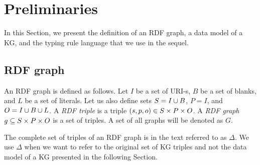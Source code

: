 \documentclass[runningheads]{llncs}
\newcommand{\memo}[1]{}
\begin{document}
\memo{
We propose to infer first the
ground type of $t$ using the stored typing of identifiers. The ground
type is minimized and then generalized to the minimal upper bound
(MUB) type. The MUB type of $t$ is an appropriate starting point to
search for the schema types of $t$ from a KG conceptual schema.

The schema type of $t=(s,p,o)$ is derived as follows. Using the
predicate $p$ as the starting point, we choose from a stored schema of
a KG all valid triple types including a predicate $p$ or one of $p$'s
super-predicates. The set of all valid schema types is minimized to
obtain a set of minimal and unrelated schema types, the candidates for
the type of $t$. 

The appropriate candidate schema types are selected by relating the
candidates to the MUB ground type by means of a subtype relation. The
disjunctively bound candidate schema types, that are related to the
MUB ground type via subtype relation, represent the final type of~$t$.

}





\section{Preliminaries\label{sec:prelim}}

In this Section, we present the definition of an RDF graph, a data model
of a KG, and the typing rule language that we use in the sequel.



\subsection{RDF graph\label{sec:kg}}

An RDF graph \cite{rdf} is defined as follows. Let $I$ be a set of
URI-s, $B$ be a set of blanks, and $L$ be a set of literals. Let us
also define sets $S = I\cup\/B$, $P = I$, and $O = I\cup\/B\cup\/L$. A
\emph{RDF triple} is a triple $(s,p,o)\in\/S\times\/P\times\/O$. A
\emph{RDF graph} $g\subseteq\/S\times\/P\times\/O$ is a set of
triples. A set of all graphs will be denoted as $G$.

The complete set of triples of an RDF graph is in the text
referred to as $\Delta$. We use $\Delta$ when we want to refer
to the original set of KG triples and not the data model of a KG
presented in the following Section.
\end{document}
